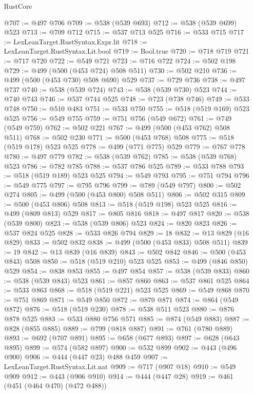 \begin{lexlean}{RustCore}
\begin{coremodule}
@707 := @497 @706
@709 := @538 (@539 @693)
@712 := @538 (@539 @699) @523
@713 := @709 @712
@715 := @537 @713 @525
@716 := @533 @715
@717 := LexLeanTarget.RustSyntax.Expr.lit
@718 := LexLeanTarget.RustSyntax.Lit.bool
@719 := Bool.true
@720 := @718 @719
@721 := @717 @720
@722 := @549 @721
@723 := @716 @722
@724 := @502 @198
@729 := @499 (@500 (@453 @724) @508 @511)
@730 := @502 @210
@736 := @499 (@500 (@453 @730) @508 @690) @529
@737 := @729 @736
@738 := @497 @737
@740 := @538 (@539 @724)
@743 := @538 (@539 @730) @523
@744 := @740 @743
@746 := @537 @744 @525
@748 := @723 (@738 @746)
@749 := @533 @748
@750 := @510 @483
@751 := @533 @750
@755 := @518 (@519 @169) @523 @525
@756 := @549 @755
@759 := @751 @756 (@549 @672)
@761 := @749 (@549 @759)
@762 := @502 @221
@767 := @499 (@500 (@453 @762) @508 @511)
@768 := @502 @230
@771 := @500 (@453 @768) @508
@775 := @518 (@519 @178) @523 @525
@778 := @499 (@771 @775) @529
@779 := @767 @778
@780 := @497 @779
@782 := @538 (@539 @762)
@785 := @538 (@539 @768) @523
@786 := @782 @785
@788 := @537 @786 @525
@789 := @533 @788
@793 := @518 (@519 @189) @523 @525
@794 := @549 @793
@795 := @751 @794
@796 := @549 @775
@797 := @795 @796
@799 := @789 (@549 @797)
@800 := @502 @274
@805 := @499 (@500 (@453 @800) @508 @511)
@806 := @502 @315
@809 := @500 (@453 @806) @508
@813 := @518 (@519 @198) @523 @525
@816 := @499 (@809 @813) @529
@817 := @805 @816
@818 := @497 @817
@820 := @538 (@539 @800)
@823 := @538 (@539 @806) @523
@824 := @820 @823
@826 := @537 @824 @525
@828 := @533 @826 @794
@829 := 18
@832 := @13 @829 (@16 @829)
@833 := @502 @832
@838 := @499 (@500 (@453 @833) @508 @511)
@839 := 19
@842 := @13 @839 (@16 @839)
@843 := @502 @842
@846 := @500 (@453 @843) @508
@850 := @518 (@519 @210) @523 @525
@853 := @499 (@846 @850) @529
@854 := @838 @853
@855 := @497 @854
@857 := @538 (@539 @833)
@860 := @538 (@539 @843) @523
@861 := @857 @860
@863 := @537 @861 @525
@864 := @533 @863
@868 := @518 (@519 @221) @523 @525
@869 := @549 @868
@870 := @751 @869
@871 := @549 @850
@872 := @870 @871
@874 := @864 (@549 @872)
@876 := @518 (@519 @230)
@878 := @538 @511 @523
@880 := @876 @878 @525
@883 := @533 @880 @756 @571
@885 := @874 (@549 @883)
@887 := @828 (@855 @885)
@889 := @799 (@818 @887)
@891 := @761 (@780 @889)
@893 := @692 (@707 @891)
@895 := @658 (@677 @893)
@897 := @628 (@643 @895)
@899 := @574 (@582 @897)
@900 := @532 @899
@902 := @443 (@496 @900)
@906 := @444 (@447 @23) @488 @459
@907 := LexLeanTarget.RustSyntax.Lit.nat
@909 := @717 (@907 @18)
@910 := @549 @909
@912 := @443 (@906 @910)
@914 := @444 (@447 @28)
@919 := @461 (@451 (@464 @470) (@472 @488))

\end{coremodule}
\end{lexlean}
